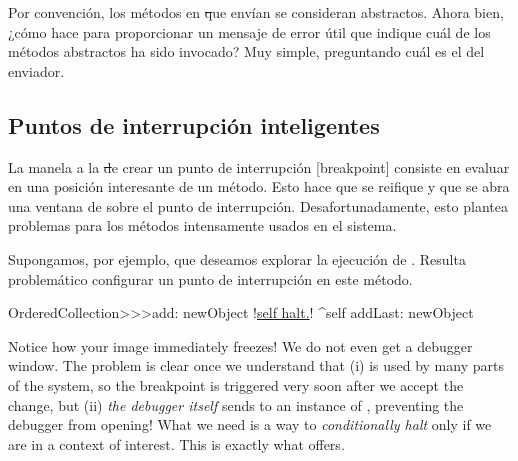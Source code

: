 \documentclass[a4paper,10pt,twoside]{book}
\begin{document}
Por convención, los métodos en \st que envían  se consideran abstractos.  Ahora bien, ¿cómo
hace  para proporcionar un
mensaje de error útil que indique cuál de los métodos abstractos ha
sido invocado?  Muy simple, preguntando cuál es el 
del enviador.

 
\subsection{Puntos de interrupción inteligentes}


La manela a la \st de crear un punto de interrupción [breakpoint]
consiste en evaluar  en una posición interesante de un
método.  Esto hace que  se reifique y que se abra una
ventana de  sobre el punto de interrupción.
Desafortunadamente, esto plantea problemas para los métodos
intensamente usados en el sistema.

Supongamos, por ejemplo, que deseamos explorar la ejecución de
.  Resulta problemático configurar un
punto de interrupción en este método.

\begin{code}{}
OrderedCollection>>>add: newObject
        !\underline{self halt.}!
        ^self addLast: newObject
\end{code}




Notice how your image immediately freezes!  We do not even get a
debugger window.  The problem is clear once we understand that (i)
 is used by many parts of the system, so
the breakpoint is triggered very soon after we accept the change, but
(ii) \emph{the debugger itself} sends  to an instance of
, preventing the debugger from opening!  What we
need is a way to \emph{conditionally halt} only if we are in a context
of interest.  This is exactly what  offers.
\end{document}
